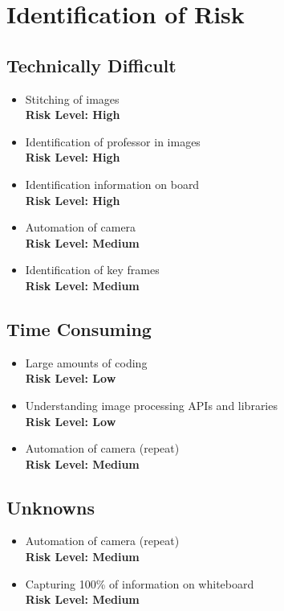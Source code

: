 \documentclass[]{article}
\begin{document}
	\section{Identification of Risk}
		
		\subsection{Technically Difficult}
			\begin{itemize}
				\item Stitching of images \\ \textbf{Risk Level: High}
				\item Identification of professor in images \\ \textbf{Risk Level: High}
				\item Identification information on board \\ \textbf{Risk Level: High}
				\item Automation of camera \\ \textbf{Risk Level: Medium}
				\item Identification of key frames  \\ \textbf{Risk Level: Medium}
			\end{itemize}
		
		\subsection{Time Consuming}
			\begin{itemize}
				\item Large amounts of coding  \\ \textbf{Risk Level: Low}
				\item Understanding image processing APIs and libraries  \\ \textbf{Risk Level: Low}
				\item Automation of camera (repeat)  \\ \textbf{Risk Level: Medium}
			\end{itemize}
			
			
		\subsection{Unknowns}
			\begin{itemize}
				\item Automation of camera (repeat)  \\ \textbf{Risk Level: Medium}
				\item Capturing 100\% of information on whiteboard  \\ \textbf{Risk Level: Medium}
			\end{itemize}
			
\end{document}
